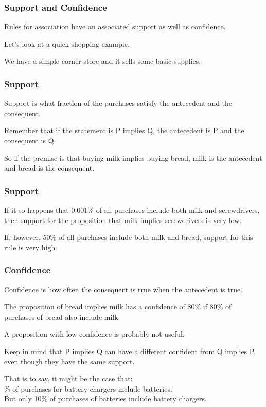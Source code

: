 \begin{frame}
\frametitle{Support and Confidence}

Rules for association have an associated \alert{support} as well as \alert{confidence}. 

Let's look at a quick shopping example. 

We have a simple corner store and it sells some basic supplies.

\end{frame}

\begin{frame}
\frametitle{Support}

Support is what fraction of the purchases satisfy the antecedent and the consequent. 

Remember that if the statement is P implies Q, the antecedent is P and the consequent is Q. 

So if the premise is that buying milk implies buying bread, milk is the antecedent and bread is the consequent. 

\end{frame}


\begin{frame}
\frametitle{Support}

If it so happens that 0.001\% of all purchases include both milk and screwdrivers, then support for the proposition that milk implies screwdrivers is very low. 

If, however, 50\% of all purchases include both milk and bread, support for this rule is very high.

\end{frame}

\begin{frame}
\frametitle{Confidence}

Confidence is how often the consequent is true when the antecedent is true. 

The proposition of bread implies milk has a confidence of 80\% if 80\% of purchases of bread also include milk. 

A proposition with low confidence is probably not useful. 

Keep in mind that P implies Q can have a different confident from Q implies P, even though they have the same support. 

That is to say, it might be the case that: \\
\% of purchases for battery chargers include batteries.\\
\quad But only 10\% of purchases of batteries include battery chargers.


\end{frame}

